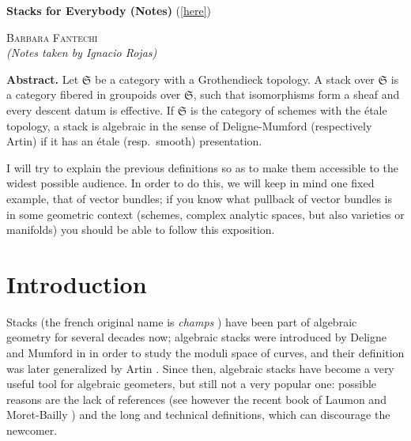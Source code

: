\documentclass[12pt]{memoir}
\def\nauthor{Ignacio Rojas}
\begin{document}

\begin{center}
{\LARGE\bfseries Stacks for Everybody (Notes)} (\ref{here})
\end{center}

\vspace{1em}

\begin{flushleft}
{\large\textsc{Barbara Fantechi}}\\[0.5em]
{\small\itshape (Notes taken by \nauthor)}
\end{flushleft}

\vspace{1em}

\noindent\textbf{Abstract.} Let $\mathfrak{S}$ be a category with a Grothendieck topology. A stack over $\mathfrak{S}$ is a category fibered in groupoids over $\mathfrak{S}$, such that isomorphisms form a sheaf and every descent datum is effective. If $\mathfrak{S}$ is the category of schemes with the \'etale topology, a stack is algebraic in the sense of Deligne-Mumford (respectively Artin) if it has an \'etale (resp.\ smooth) presentation.

I will try to explain the previous definitions so as to make them accessible to the widest possible audience. In order to do this, we will keep in mind one fixed example, that of vector bundles; if you know what pullback of vector bundles is in some geometric context (schemes, complex analytic spaces, but also varieties or manifolds) you should be able to follow this exposition.

\let\thefootnote\relax{}

\section{Introduction}

Stacks (the french original name is \emph{champs} \cite{4}) have been part of algebraic geometry for several decades now; algebraic stacks were introduced by Deligne and Mumford in \cite{3} in order to study the moduli space of curves, and their definition was later generalized by Artin \cite{1}. Since then, algebraic stacks have become a very useful tool for algebraic geometers, but still not a very popular one: possible reasons are the lack of references (see however the recent book of Laumon and Moret-Bailly \cite{5}) and the long and technical definitions, which can discourage the newcomer.
\end{document}
